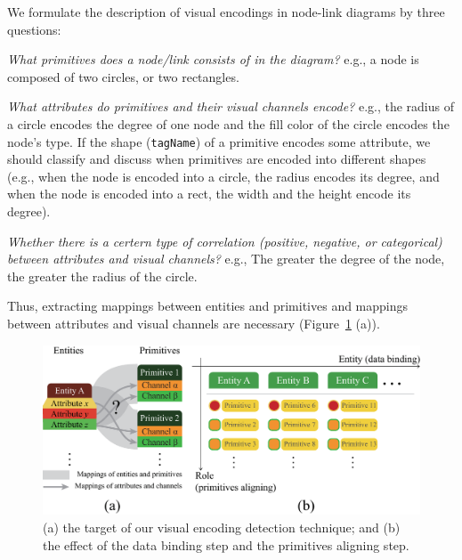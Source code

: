 We formulate the description of visual encodings in node-link diagrams by three questions:
\begin{compactenum}[\textbf{Q}1]
    \item \textit{What primitives does a node/link consists of in the diagram?} e.g., a node is composed of two circles, or two rectangles. \label{qstn:composition}
    
    \item \textit{What attributes do primitives and their visual channels encode?} e.g., the radius of a circle encodes the degree of one node and the fill color of the circle encodes the node's type. If the shape (\texttt{tagName}) of a primitive encodes some attribute, we should classify and discuss when primitives are encoded into different shapes (e.g., when the node is encoded into a circle, the radius encodes its degree, and when the node is encoded into a rect, the width and the height encode its degree). \label{qstn:encodings}
    
    \item \textit{Whether there is a certern type of correlation (positive, negative, or categorical) between attributes and visual channels?} e.g., The greater the degree of the node, the greater the radius of the circle.\label{qstn:correlation}
\end{compactenum}
Thus, extracting mappings between entities and primitives and mappings between attributes and visual channels are necessary (Figure~\ref{fig:PrimitiveAligning} (a)).


\begin{figure}
    \centering
    \includegraphics[width=1\columnwidth]{figures/PrimitiveAligning.eps}
    \caption{(a) the target of our visual encoding detection technique; and (b) the effect of the data binding step and the primitives aligning step.}
    \label{fig:PrimitiveAligning}
\end{figure}

